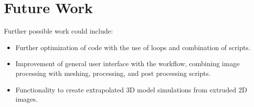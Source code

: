 \documentclass[report.tex]{subfiles}
\begin{document}
\section{Future Work}
Further possible work could include:

\begin{itemize}
  \item Further optimization of code with the use of loops and combination of scripts.
  \item Improvement of general user interface with the workflow, combining image processing with meshing, processing, and post processing scripts.
  \item Functionality to create extrapolated 3D model simulations from extruded 2D images.
\end{itemize}
\end{document}
